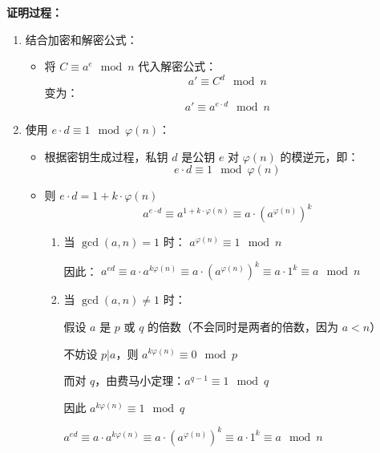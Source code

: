 \documentclass[11pt]{article}
\begin{document}
\textbf{证明过程：}
\begin{enumerate}

    \item 结合加密和解密公式：
    \begin{itemize}
        \item 将 \( C \equiv a^e \mod n \) 代入解密公式：
        \[
     a' \equiv C^d \mod n
        \]
        变为：
        \[
        a' \equiv a^{e \cdot d} \mod n
        \]
    \end{itemize}

    \item 使用 \( e \cdot d \equiv 1 \mod \varphi(n) \)：
    \begin{itemize}
        \item 根据密钥生成过程，私钥 \( d \) 是公钥 \( e \) 对 \( \varphi(n) \) 的模逆元，即：
        \[
     e \cdot d \equiv 1 \mod \varphi(n)
        \]
        \item 则 $e \cdot d = 1 + k \cdot \varphi(n)$
        \[
        a^{e \cdot d} \equiv a^{1 + k \cdot \varphi(n)} \equiv a \cdot (a^{\varphi(n)})^k
        \]

        \begin{enumerate}
            \item 当 $\gcd(a,n)=1$ 时：
            $a^{\varphi(n)} \equiv 1 \mod n$
            
            因此：
            $a^{ed} \equiv a \cdot a^{k\varphi(n)} \equiv a \cdot (a^{\varphi(n)})^k \equiv a \cdot 1^k \equiv a \mod n$
            \item 当 $\gcd(a,n) \not= 1$ 时：
            
            假设 $a$ 是 $p$ 或 $q$ 的倍数（不会同时是两者的倍数，因为 $a < n$）

            不妨设 $p|a$，则 $a^{k\varphi(n)} \equiv 0 \mod p$

            而对 $q$，由费马小定理：$a^{q-1} \equiv 1 \mod q$

            因此 $a^{k\varphi(n)} \equiv 1 \mod q$

            $a^{ed} \equiv a \cdot a^{k\varphi(n)} \equiv a \cdot (a^{\varphi(n)})^k \equiv a \cdot 1^k \equiv a \mod n$

            
        \end{enumerate}
    \end{itemize}
\end{enumerate}
\end{document}
